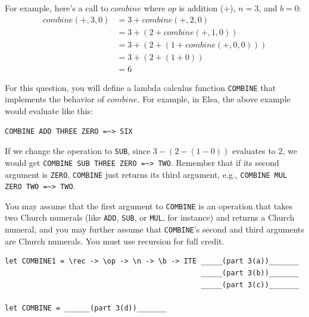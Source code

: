 \documentclass[addpoints]{exam}
\begin{document}
\begin{questions}
For example, here's a call to $\mathit{combine}$ where $\mathit{op}$ is addition ($+$), $n = 3$, and $b = 0$:
\begin{align*}
\mathit{combine}(+, 3, 0) & = 3 + \mathit{combine}(+, 2, 0) \\
                          & = 3 + (2 + \mathit{combine}(+, 1, 0)) \\
		          & = 3 + (2 + (1 + \mathit{combine}(+, 0, 0))) \\
		          & = 3 + (2 + (1 + 0)) \\
                          & = 6
\end{align*}

For this question, you will define a lambda calculus function \verb|COMBINE| that implements the behavior of $\mathit{combine}$. For example, in Elsa, the above example would evaluate like this:
\begin{verbatim}
COMBINE ADD THREE ZERO =~> SIX
\end{verbatim}
If we change the operation to \verb|SUB|, since $3 - (2 - (1 - 0))$ evaluates to $2$, we would get \verb|COMBINE SUB THREE ZERO =~> TWO|. Remember that if its second argument is \verb|ZERO|, \verb|COMBINE| just returns its third argument, e.g., \verb|COMBINE MUL ZERO TWO =~> TWO|.

You may assume that the first argument to \verb|COMBINE| is an operation that takes two Church numerals (like \verb|ADD|, \verb|SUB|, or \verb|MUL|, for instance) and returns a Church numeral, and you may further assume that \verb|COMBINE|'s second and third arguments are Church numerals.  You must use recursion for full credit.

\begin{verbatim}
let COMBINE1 = \rec -> \op -> \n -> \b -> ITE _____(part 3(a))_______
                                              _____(part 3(b))_______
                                              _____(part 3(c))_______
                      
let COMBINE = ______(part 3(d))_______
\end{verbatim}

\end{questions}
\end{document}

